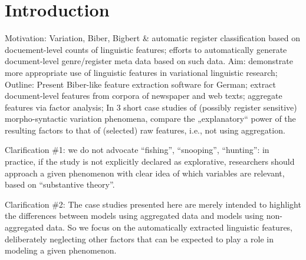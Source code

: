 \section{Introduction}

Motivation: Variation, Biber, Bigbert \& automatic register classification based on docuement-level counts of linguistic features; efforts to automatically generate document-level genre/register meta data based on such data.
Aim: demonstrate more appropriate use of linguistic features in variational linguistic research;
Outline: Present Biber-like feature extraction software for German; extract document-level features from corpora of newspaper and web texts; aggregate features via factor analysis; 
In 3 short case studies of (possibly register sensitive) morpho-syntactic variation phenomena, compare the „explanatory“ power of the resulting factors to that of (selected) raw features, i.e., not using aggregation. 

Clarification \#1: we do not advocate ``fishing'', ``snooping'', ``hunting'': in practice, if the  study is not explicitly declared as explorative, researchers should approach a given phenomenon with clear idea of which variables are relevant, based on ``substantive theory''.

Clarification \#2: The case studies presented here are merely intended to highlight the differences between models using aggregated data and models using non-aggregated data. So we focus on the automatically extracted linguistic features, deliberately neglecting other factors that can be expected to play a role in modeling a given phenomenon.
